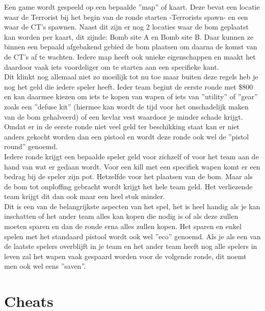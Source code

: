 \documentclass[pdftex,a4paper,12pt,twoside]{report}
\begin{document}
Een game wordt gespeeld op een bepaalde ''map'' of kaart. Deze bevat een locatie waar de Terrorist bij het begin van de ronde starten -Terrorists spawn- en een waar de CT's spawnen. Naast dit zijn er nog 2 locaties waar de bom geplaatst kan worden per kaart, dit zijnde: Bomb site A en Bomb site B. Daar kunnen ze binnen een bepaald afgebakend gebied de bom plaatsen om daarna de komst van de CT's af te wachten. Iedere map heeft ook unieke eigenschappen en maakt het daardoor vaak iets voordeliger om te starten aan een specifieke kant.
\\

Dit klinkt nog allemaal niet zo moeilijk tot nu toe maar buiten deze regels heb je nog het geld die iedere speler heeft. Ieder team begint de eerste ronde met \$800 en kan daarmee kiezen om iets te kopen van wapen of iets van ''utility'' of ''gear'' zoals een ''defuse kit'' (hiermee kan wordt de tijd voor het onschadelijk maken van de bom gehalveerd) of een kevlar vest waardoor je minder schade krijgt. 
Omdat er in de eerste ronde niet veel geld ter beschikking staat kan er niet anders gekocht worden dan een pistool en wordt deze ronde ook wel de ''pistol round'' genoemd.
\\

Iedere ronde krijgt een bepaalde speler geld voor zichzelf of voor het team aan de hand van wat er gedaan wordt. Voor een kill met een specifiek wapen komt er een bedrag bij de speler zijn pot. Hetzelfde voor het plaatsen van de bom. Maar als de bom tot onploffing gebracht wordt krijgt het hele team geld. Het verliezende team krijgt dit dan ook maar een heel stuk minder.
\\

Dit is een van de belangrijkste aspecten van het spel, het is heel handig als je kan inschatten of het ander team alles kan kopen die nodig is of als deze zullen moeten sparen en dan de ronde erna alles zullen kopen. Het sparen en enkel spelen met het standaard pistool wordt ook wel ''eco'' genoemd. Als je als een van de laatste spelers overblijft in je team en het ander team heeft nog alle spelers in leven zal het wapen vaak gespaard worden voor de volgende ronde, dit noemt men ook wel eens ''saven''.


\chapter{Cheats}
\label{ch:cheats}
\end{document}
